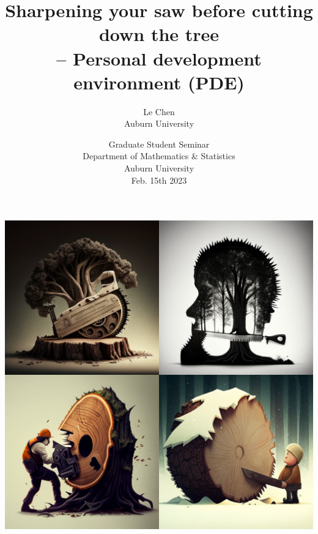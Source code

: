 \documentclass[9pt,table,xcolor=dvipsnames]{beamer}%
\title{Sharpening your saw before cutting down the tree
\\ -- Personal development environment (PDE)}%
\author{Le Chen\\
Auburn University
}
\institute[Auburn University]
{%
\pgfuseimage{Emory}
 }
\date[Columbus]{
  \footnotesize
  Graduate Student Seminar \\[1em]
  Department of Mathematics \& Statistics\\[0.5em]
  Auburn University\\[1em]
  Feb. 15th 2023\\
}
\theoremstyle{definition}
\theoremstyle{plain}
\begin{document}
\begin{frame}[noframenumbering]
  \titlepage
\end{frame}
\begin{frame}[fragile] %
  \bigskip
  \begin{center}
    \includegraphics[scale=0.25]{./figs/chenle02_Illustrate_the_idea_If_you_sharpen_the_saw_you_would.png}
  \end{center}
\end{frame}
\end{document}
